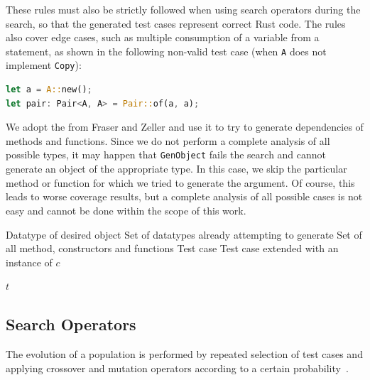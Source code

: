 \documentclass[paper=a4,%
  twoside,%
  BCOR4mm,%
  abstract=true,%
  toc=bibliography,%
  chapterprefix=true,%
  toc=bibliographynumbered,%
  open=right,%
  english,%
  pagesize=pdftex]{scrreprt}
\newcommand{\Desc}[2]{\State \makebox[2em][l]{#1}#2}
\begin{document}
These rules must also be strictly followed when using search operators during the search, so that the generated test cases represent correct Rust code. The rules also cover edge cases, such as multiple consumption of a variable from a statement, as shown in the following non-valid test case (when \lstinline{A} does not implement \lstinline{Copy}):
\begin{lstlisting}[language=Rust, style=boxed, caption={}]
let a = A::new();
let pair: Pair<A, A> = Pair::of(a, a);
\end{lstlisting}

We adopt the  from Fraser and Zeller and use it to try to generate dependencies of methods and functions. Since we do not perform a complete analysis of all possible types, it may happen that \lstinline{GenObject} fails the search and cannot generate an object of the appropriate type. In this case, we skip the particular method or function for which we tried to generate the argument. Of course, this leads to worse coverage results, but a complete analysis of all possible cases is not easy and cannot be done within the scope of this work.

\begin{algorithm}[t]
\caption{$GenObject(c, G, M, t)$}\label{alg:genobject}
\begin{algorithmic}
\Input
  \Desc{$c$}{Datatype of desired object}
  \Desc{$G$}{Set of datatypes already attempting to generate}
  \Desc{$M$}{Set of all method, constructors and functions}
  \Desc{$t$}{Test case}
\EndInput
\Output
  \Desc{$t$}{Test case extended with an instance of $c$}
\EndOutput
{}

  \EndIf
\EndFor
{}
\State \Return $t$
\end{algorithmic}
\end{algorithm}

\subsection{Search Operators}
\label{sec:search-operators}
The evolution of a population is performed by repeated selection of test cases and applying crossover and mutation operators according to a certain probability~\cite{Fraser2012}.
\end{document}
